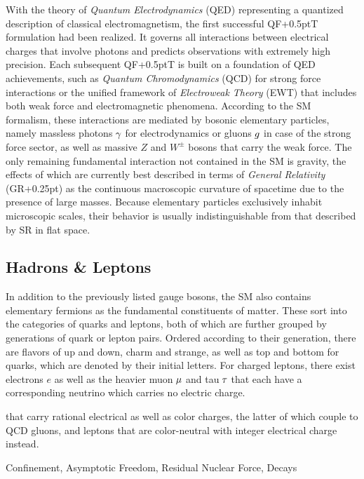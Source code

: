 With the theory of \emph{Quantum Electrodynamics} (QED) representing a quantized description of classical electromagnetism, the
first successful QF{\kern+0.5pt}T formulation had been realized. It governs all interactions between electrical charges that involve
photons and predicts observations with extremely high precision. Each subsequent QF{\kern+0.5pt}T is built on a foundation of QED
achievements, such as \emph{Quantum Chromodynamics} (QCD) for strong force interactions or the unified framework of
\emph{Electroweak Theory} (EWT) that includes both weak force and electromagnetic phenomena. According to the SM formalism, these
interactions are mediated by bosonic elementary particles, namely massless photons $\kern-0.5pt \gamma$ for electrodynamics or
gluons $\kern-0.5pt g$ in case of the strong force sector, as well as massive $Z$ and $W^\pm$ bosons that carry the weak force. 
The only remaining fundamental interaction not contained in the SM is gravity, the effects of which are currently best described
in terms of \emph{General Relativity} (GR{\kern+0.25pt}) as the continuous macroscopic curvature of spacetime due to the presence
of large masses. Because elementary particles exclusively inhabit microscopic scales, their behavior is usually indistinguishable
from that described by SR in flat space.



\subsection{Hadrons \& Leptons}
\label{sub:hadrons}

In addition to the previously listed gauge bosons, the SM also contains elementary fermions as the fundamental constituents of
matter. These sort into the categories of quarks and leptons, both of which are further grouped by generations of quark or lepton pairs.
Ordered according to their generation, there are flavors of up and down, charm and strange, as well as top and bottom for quarks,
which are denoted by their initial letters. For charged leptons, there exist electrons $e$ as well as the heavier muon $\kern-0.5pt \mu$
and tau $\kern-1.0pt \tau$ that each have a corresponding neutrino which carries no electric charge.



that carry rational electrical as well as color charges, the latter of which
couple to QCD gluons, and leptons that are color-neutral with integer electrical charge instead. 


Confinement, Asymptotic Freedom, Residual Nuclear Force, Decays



